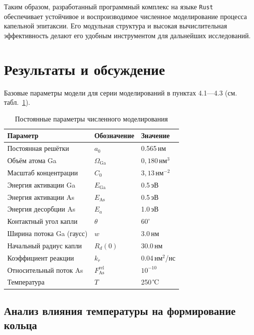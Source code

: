 \documentclass[14pt,oneside]{extarticle}
\begin{document}
Таким образом, разработанный программный комплекс на языке \texttt{Rust} обеспечивает устойчивое и воспроизводимое численное моделирование процесса капельной эпитаксии. Его модульная структура и высокая вычислительная эффективность делают его удобным инструментом для дальнейших исследований.

\pagebreak
\section{Результаты и обсуждение}

Базовые параметры модели для серии моделирований в пунктах 4.1—4.3 (см. табл.~\ref{tab:params-fixed}).

\begin{table}
    \centering
    \caption{Постоянные параметры численного моделирования}
    \label{tab:params-fixed}
    \begin{tabular}{|l|l|l|}
    \hline
    \textbf{Параметр} & \textbf{Обозначение} & \textbf{Значение} \\ \hline
    Постоянная решётки & $a_0$ & 0.565\,нм \\ \hline
    Объём атома Ga & $\Omega_{\text{Ga}}$ &  $0{,}180\,\text{нм}^3$ \\ \hline
    Масштаб концентрации & $C_0$ & $ 3{,}13\,\text{нм}^{-2}$ \\ \hline
    Энергия активации Ga & $E_{\text{Ga}}$ & 0.5\,эВ \\ \hline
    Энергия активации As & $E_{\text{As}}$ & 0.5\,эВ \\ \hline
    Энергия десорбции As & $E_a$ & 1.0\,эВ \\ \hline
    Контактный угол капли & $\theta$ & $60^\circ$ \\ \hline
    Ширина потока Ga (гаусс) & $w$ & 3.0\,нм \\ \hline
    Начальный радиус капли & $R_d(0)$ & 30.0\,нм \\ \hline
    Коэффициент реакции & $k_r$ & 0.04\,нм$^2$/нс \\ \hline
    Относительный поток As & $F_{\text{As}}^{\text{rel}}$ & $10^{-10}$ \\ \hline
    Температура & $T$ & 250\,℃ \\ \hline
    \end{tabular}
\end{table}    

\subsection{Анализ влияния температуры на формирование кольца}
\end{document}
